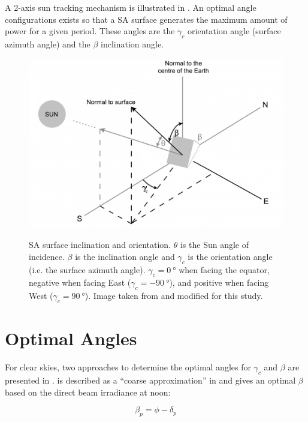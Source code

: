 A 2-axis sun tracking mechanism is illustrated in . An optimal angle configurations exists so that a \ac{SA} surface generates the maximum amount of power for a given period. These angles are the $\gamma_{c}$ orientation angle (surface azimuth angle) and the $\beta$ inclination angle.

\begin{figure}[h]
  \centering
  \hypersetup{linkcolor=captionTextColor}
  \includegraphics[width=0.7\linewidth]{sections/appendix/optimal-angles/images/beta-and-gamma-angles-on-tilted-surface.png}\\
  \caption[Solar array surface inclination and orientation]
          {\ac{SA} surface inclination and orientation. $\theta$ is the Sun angle of incidence. $\beta$ is the inclination angle and $\gamma_{c}$ is the orientation angle (i.e. the surface azimuth angle). $\gamma_{c} = \SI{0}{\degree}$ when facing the equator, negative when facing East ($\gamma_{c} = \SI{-90}{\degree}$), and positive when facing West ($\gamma_{c} = \SI{+90}{\degree}$). Image taken from  and modified for this study.}
  \label{fig:tilted-surface-sun-tracking}
\end{figure}

\section{Optimal Angles}
For clear skies, two approaches to determine the optimal angles for $\gamma_{c}$ and $\beta$ are presented in .  is described as a ``coarse approximation'' in  and gives an optimal $\beta$ based on the direct beam irradiance at noon:

\begin{equation}
  \label{eq:optimal_beta_irradiance}
  \beta_{p} = \phi - \delta_{p}
\end{equation}

